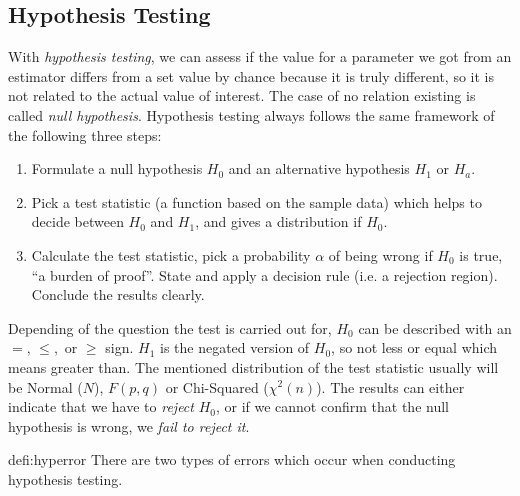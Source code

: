 \subsection{Hypothesis Testing}
	With \emph{hypothesis testing}, we can assess if the value for a parameter we got from an estimator differs from a set value by chance because it is truly different, so it is not related to the actual value of interest. The case of no relation existing is called \emph{null hypothesis}. Hypothesis testing always follows the same framework of the following three steps: 
	\begin{enumerate}
		\item Formulate a null hypothesis $H_0$ and an alternative hypothesis $H_1$ or $H_a$.
		\item Pick a test statistic (a function based on the sample data) which helps to decide between $H_0$ and $H_1$, and gives a distribution if $H_0$.
		\item Calculate the test statistic, pick a probability $\alpha$ of being wrong if $H_0$ is true, \enquote{a burden of proof}. State and apply a decision rule (i.e. a rejection region). Conclude the results clearly.
	\end{enumerate}
	Depending of the question the test is carried out for, $H_0$ can be described with an $=,\,\leq,$ or $\geq$ sign. $H_1$ is the negated version of $H_0$, so not less or equal which means greater than. The mentioned distribution of the test statistic usually will be Normal ($N$), $F(p,q)$ or Chi-Squared ($\chi^2(n)$). The results can either indicate that we have to \emph{reject} $H_0$, or if we cannot confirm that the null hypothesis is wrong, we \emph{fail to reject it}.
	\begin{defi}{defi:hyperror}
		There are two types of errors which occur when conducting hypothesis testing.
	\end{defi}
